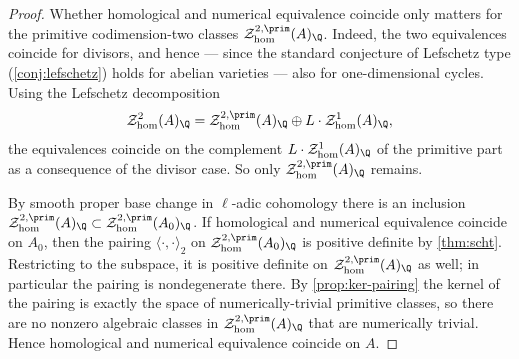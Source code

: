 \begin{proof}
  Whether homological and numerical equivalence coincide only matters for the
  primitive codimension-two classes \(\mathcal{Z}_{\hom}^{2,\prim}(A)_{\Q}\).
  Indeed, the two equivalences coincide for divisors, and hence — since the
  standard conjecture of Lefschetz type (\cref{conj:lefschetz}) holds for abelian
  varieties — also for one-dimensional cycles. Using the Lefschetz decomposition
  \[
    \mathcal{Z}_{\hom}^{2}(A)_{\Q}
      = \mathcal{Z}_{\hom}^{2,\prim}(A)_{\Q}
        \oplus L \cdot \mathcal{Z}_{\hom}^{1}(A)_{\Q},
  \]
  the equivalences coincide on the complement \(L \cdot
  \mathcal{Z}_{\hom}^{1}(A)_{\Q}\) of the primitive part as a consequence of the
  divisor case. So only \(\mathcal{Z}_{\hom}^{2,\prim}(A)_{\Q}\) remains.

  By smooth proper base change in \(\ell\)-adic cohomology there is an inclusion
  \(\mathcal{Z}_{\hom}^{2,\prim}(A)_{\Q} \subset
  \mathcal{Z}_{\hom}^{2,\prim}(A_0)_{\Q}\). If homological and numerical
  equivalence coincide on \(A_0\), then the pairing \(\langle \cdot, \cdot
  \rangle_{2}\) on \(\mathcal{Z}_{\hom}^{2,\prim}(A_0)_{\Q}\) is positive definite
  by \cref{thm:scht}. Restricting to the subspace, it is positive definite on
  \(\mathcal{Z}_{\hom}^{2,\prim}(A)_{\Q}\) as well; in particular the pairing is
  nondegenerate there. By \cref{prop:ker-pairing} the kernel of the pairing is
  exactly the space of numerically-trivial primitive classes, so there are no
  nonzero algebraic classes in \(\mathcal{Z}_{\hom}^{2,\prim}(A)_{\Q}\) that are
  numerically trivial. Hence homological and numerical equivalence coincide on
  \(A\).
\end{proof}

